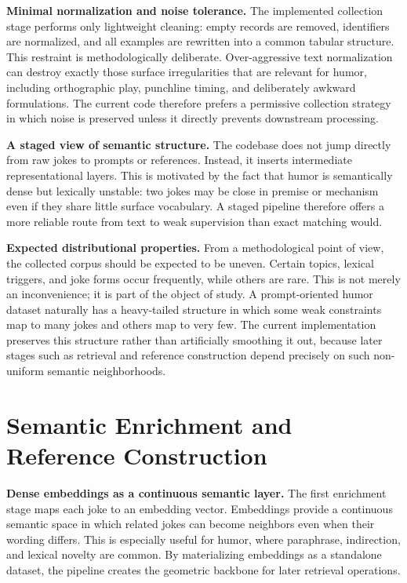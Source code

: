 \documentclass[12pt]{extarticle}
\begin{document}
\textbf{Minimal normalization and noise tolerance.} The implemented collection stage performs only lightweight cleaning: empty records are removed, identifiers are normalized, and all examples are rewritten into a common tabular structure. This restraint is methodologically deliberate. Over-aggressive text normalization can destroy exactly those surface irregularities that are relevant for humor, including orthographic play, punchline timing, and deliberately awkward formulations. The current code therefore prefers a permissive collection strategy in which noise is preserved unless it directly prevents downstream processing.

\textbf{A staged view of semantic structure.} The codebase does not jump directly from raw jokes to prompts or references. Instead, it inserts intermediate representational layers. This is motivated by the fact that humor is semantically dense but lexically unstable: two jokes may be close in premise or mechanism even if they share little surface vocabulary. A staged pipeline therefore offers a more reliable route from text to weak supervision than exact matching would.

\textbf{Expected distributional properties.} From a methodological point of view, the collected corpus should be expected to be uneven. Certain topics, lexical triggers, and joke forms occur frequently, while others are rare. This is not merely an inconvenience; it is part of the object of study. A prompt-oriented humor dataset naturally has a heavy-tailed structure in which some weak constraints map to many jokes and others map to very few. The current implementation preserves this structure rather than artificially smoothing it out, because later stages such as retrieval and reference construction depend precisely on such non-uniform semantic neighborhoods.

\section{Semantic Enrichment and Reference Construction}

\textbf{Dense embeddings as a continuous semantic layer.} The first enrichment stage maps each joke to an embedding vector. Embeddings provide a continuous semantic space in which related jokes can become neighbors even when their wording differs. This is especially useful for humor, where paraphrase, indirection, and lexical novelty are common. By materializing embeddings as a standalone dataset, the pipeline creates the geometric backbone for later retrieval operations.
\end{document}
